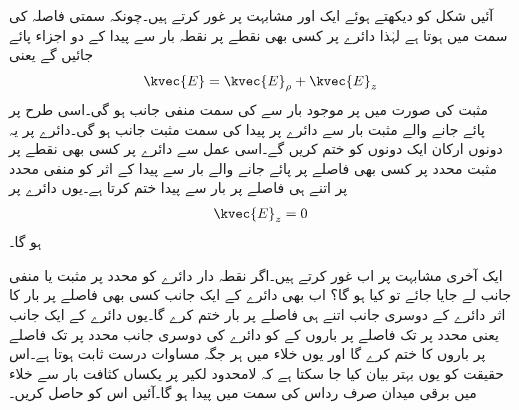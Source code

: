 آئیں شکل  کو دیکھتے ہوئے  ایک اور مشابہت پر غور کرتے ہیں۔چونکہ  سمتی فاصلہ  کی سمت میں ہوتا ہے لہٰذا دائرے پر کسی بھی نقطے پر نقطہ بار  سے پیدا   کے دو اجزاء پائے جائیں گے یعنی
\begin{align}
\kvec{E}=\kvec{E}_\rho+\kvec{E}_z
\end{align}
مثبت  کی صورت میں  پر موجود بار سے   کی سمت منفی   جانب ہو گی۔اسی طرح  پر پائے جانے والے مثبت بار سے دائرے پر پیدا  کی سمت مثبت  جانب ہو گی۔دائرے پر یہ دونوں ارکان ایک دونوں کو ختم کریں گے۔اسی عمل سے دائرے پر کسی بھی نقطے پر مثبت  محدد پر کسی  بھی  فاصلے پر پائے جانے والے بار سے پیدا  کے اثر کو منفی  محدد پر اتنے ہی فاصلے پر بار سے پیدا   ختم کرتا ہے۔یوں دائرے پر
\begin{align}\label{مساوات_کولمب_لامحدود_بار_رداس_کا_میدان_صفر}
\kvec{E}_z=0
\end{align}
ہو گا۔

ایک آخری مشابہت پر اب غور کرتے ہیں۔اگر نقطہ دار دائرے کو  محدد پر مثبت یا منفی جانب  لے جایا جائے تو کیا ہو گا؟ اب بھی دائرے  کے ایک جانب کسی بھی فاصلے پر بار کا اثر دائرے کے دوسری جانب اتنے ہی فاصلے پر بار ختم کرے گا۔یوں دائرے کے ایک جانب یعنی  محدد پر  تک فاصلے پر باروں کے  کو دائرے کی دوسری جانب  محدد پر  تک فاصلے پر باروں کا  ختم کرے گا اور یوں خلاء میں  ہر جگہ مساوات  درست ثابت ہوتا ہے۔اس حقیقت کو یوں بہتر بیان کیا جا سکتا ہے کہ  لامحدود لکیر پر یکساں کثافت بار  سے خلاء میں برقی میدان صرف رداس کی سمت میں پیدا ہو گا۔آئیں  اس  کو حاصل کریں۔

